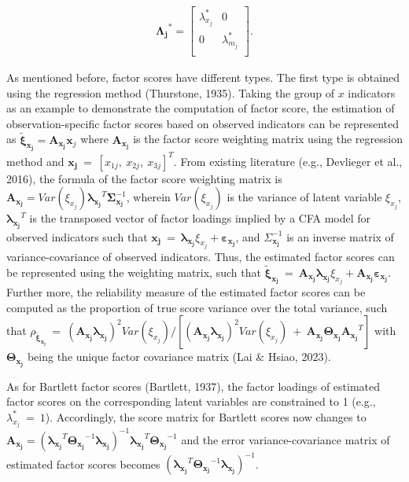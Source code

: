 \documentclass[
  man]{apa7}
\begin{document}
\begin{align}
\boldsymbol{\Lambda_{j}}^\text{*} = 
    \begin{bmatrix}
        \lambda_{x_{j}}^\text{*} & 0 \\
        0 & \lambda_{m_{j}}^\text{*} \\ 
    \end{bmatrix}.
\end{align}

As mentioned before, factor scores have different types. The first type is obtained using the regression method (Thurstone, 1935). Taking the group of \(x\) indicators as an example to demonstrate the computation of factor score, the estimation of observation-specific factor scores based on observed indicators can be represented as \(\boldsymbol{\tilde{\xi}_{x_{j}}} = \boldsymbol{A_{x_{j}}} \boldsymbol{x}_{j}\) where \(\boldsymbol{A_{x_{j}}}\) is the factor score weighting matrix using the regression method and \(\boldsymbol{x_{j}} \ = \ [x_{1j}, \ x_{2j}, \ x_{3j}]^T\). From existing literature (e.g., Devlieger et al., 2016), the formula of the factor score weighting matrix is \(\boldsymbol{A_{x_{j}}} = Var(\xi_{x_{j}})\boldsymbol{\lambda_{x_{j}}}^T\boldsymbol{\Sigma}_{\boldsymbol{x_{j}}}^{-1}\), wherein \(Var(\xi_{x_{j}})\) is the variance of latent variable \(\xi_{x_{j}}\), \(\boldsymbol{\lambda_{x_{j}}}^T\) is the transposed vector of factor loadings implied by a CFA model for observed indicators such that \(\boldsymbol{x_{j}} \ = \ \boldsymbol{\lambda_{x_{j}}}\xi_{x_{j}} + \boldsymbol{\varepsilon_{x_{j}}}\), and \({\Sigma}_{\boldsymbol{x_{j}}}^{-1}\) is an inverse matrix of variance-covariance of observed indicators. Thus, the estimated factor scores can be represented using the weighting matrix, such that \(\boldsymbol{\tilde{\xi}_{x_{j}}} \ = \ \boldsymbol{A_{x_{j}}} \boldsymbol{\lambda_{x_{j}}}\xi_{x_{j}} + \boldsymbol{A_{x_{j}}}\boldsymbol{\varepsilon_{x_{j}}}\). Further more, the reliability measure of the estimated factor scores can be computed as the proportion of true score variance over the total variance, such that \(\rho_{\boldsymbol{\tilde{\xi}_{x_{j}}}} \ = \ (\boldsymbol{A_{x_{j}}} \boldsymbol{\lambda_{x_{j}}})^2Var(\xi_{x_{j}})/[(\boldsymbol{A_{x_{j}}} \boldsymbol{\lambda_{x_{j}}})^2Var(\xi_{x_{j}}) \ + \ \boldsymbol{A_{x_{j}}}\boldsymbol{\Theta_{x_{j}}}\boldsymbol{A_{x_{j}}}^T]\) with \(\boldsymbol{\Theta_{x_{j}}}\) being the unique factor covariance matrix (Lai \& Hsiao, 2023).

As for Bartlett factor scores (Bartlett, 1937), the factor loadings of estimated factor scores on the corresponding latent variables are constrained to 1 (e.g., \(\lambda_{x_{j}}^\text{*} \ = \ 1\)). Accordingly, the score matrix for Bartlett scores now changes to \(\boldsymbol{A_{x_{j}}} = (\boldsymbol{\lambda_{x_{j}}}^T\boldsymbol{\Theta_{x_{j}}}^{-1}\boldsymbol{\lambda_{x_{j}}})^{-1}\boldsymbol{\lambda_{x_{j}}}^T\boldsymbol{\Theta_{x_{j}}}^{-1}\) and the error variance-covariance matrix of estimated factor scores becomes \((\boldsymbol{\lambda_{x_{j}}}^T\boldsymbol{\Theta_{x_{j}}}^{-1}\boldsymbol{\lambda_{x_{j}}})^{-1}\).
\end{document}
